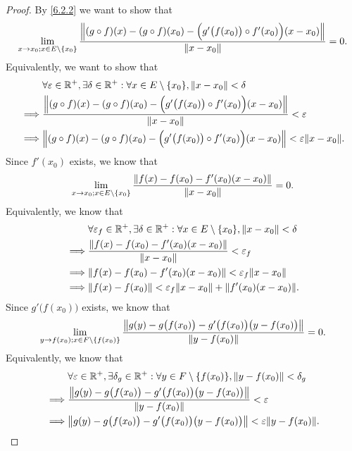 \begin{proof}
  By \cref{6.2.2} we want to show that
  \[
    \lim_{x \to x_0 ; x \in E \setminus \set{x_0}} \dfrac{\norm*{(g \circ f)(x) - (g \circ f)(x_0) - \Big(g'\big(f(x_0)\big) \circ f'(x_0)\Big)(x - x_0)}}{\norm*{x - x_0}} = 0.
  \]
  Equivalently, we want to show that
  \begin{align*}
             & \forall \varepsilon \in \R^+, \exists \delta \in \R^+ : \forall x \in E \setminus \set{x_0}, \norm*{x - x_0} < \delta                  \\
    \implies & \dfrac{\norm*{(g \circ f)(x) - (g \circ f)(x_0) - \Big(g'\big(f(x_0)\big) \circ f'(x_0)\Big)(x - x_0)}}{\norm*{x - x_0}} < \varepsilon \\
    \implies & \norm*{(g \circ f)(x) - (g \circ f)(x_0) - \Big(g'\big(f(x_0)\big) \circ f'(x_0)\Big)(x - x_0)} < \varepsilon \norm*{x - x_0}.
  \end{align*}
  Since \(f'(x_0)\) exists, we know that
  \[
    \lim_{x \to x_0 ; x \in E \setminus \set{x_0}} \dfrac{\norm*{f(x) - f(x_0) - f'(x_0)(x - x_0)}}{\norm*{x - x_0}} = 0.
  \]
  Equivalently, we know that
  \begin{align*}
             & \forall \varepsilon_f \in \R^+, \exists \delta \in \R^+ : \forall x \in E \setminus \set{x_0}, \norm*{x - x_0} < \delta \\
    \implies & \dfrac{\norm*{f(x) - f(x_0) - f'(x_0)(x - x_0)}}{\norm*{x - x_0}} < \varepsilon_f                                       \\
    \implies & \norm*{f(x) - f(x_0) - f'(x_0)(x - x_0)} < \varepsilon_f \norm*{x - x_0}                                                \\
    \implies & \norm*{f(x) - f(x_0)} < \varepsilon_f \norm*{x - x_0} + \norm*{f'(x_0)(x - x_0)}.
  \end{align*}
  Since \(g'\big(f(x_0)\big)\) exists, we know that
  \[
    \lim_{y \to f(x_0) ; x \in F \setminus \set{f(x_0)}} \dfrac{\norm*{g(y) - g\big(f(x_0)\big) - g'\big(f(x_0)\big)\big(y - f(x_0)\big)}}{\norm*{y - f(x_0)}} = 0.
  \]
  Equivalently, we know that
  \begin{align*}
             & \forall \varepsilon \in \R^+, \exists \delta_g \in \R^+ : \forall y \in F \setminus \set{f(x_0)}, \norm*{y - f(x_0)} < \delta_g \\
    \implies & \dfrac{\norm*{g(y) - g\big(f(x_0)\big) - g'\big(f(x_0)\big)\big(y - f(x_0)\big)}}{\norm*{y - f(x_0)}} < \varepsilon             \\
    \implies & \norm*{g(y) - g\big(f(x_0)\big) - g'\big(f(x_0)\big)\big(y - f(x_0)\big)} < \varepsilon \norm*{y - f(x_0)}.

\end{align*}
\end{proof}
